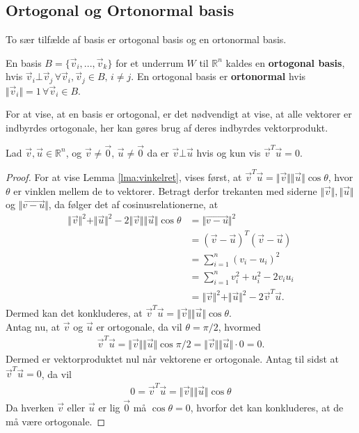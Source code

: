 \subsection{Ortogonal og Ortonormal basis}
To sær tilfælde af basis er ortogonal basis og en ortonormal basis.
\begin{defn}
En basis $B = \{\vec{v}_i,..., \vec{v}_k\}$ for  et underrum $W$ til $\mathds{R}^n$ kaldes en \textbf{ortogonal basis}, hvis 
$\vec{v}_i \bot \vec{v}_j \, \forall \vec{v}_i, \vec{v}_j \in B, \, i \neq j$. En ortogonal basis er \textbf{ortonormal} hvis $\Vert\vec{v}_i\Vert = 1 \, \forall \vec{v}_i \in B$.
\end{defn}
For at vise, at en basis er ortogonal, er det nødvendigt at vise, at alle vektorer er indbyrdes ortogonale, her kan gøres brug af deres indbyrdes vektorprodukt.
\begin{lma}
Lad $\vec{v}, \vec{u} \in \mathds{R}^n$, og $\vec{v}\neq \vec{0}$, $\vec{u} \neq \vec{0}$ da er $\vec{v} \bot \vec{u}$ hvis og kun vis $\vec{v}^T\vec{u} = 0$.
\label{lma:vinkelret}
\end{lma}
\begin{proof}
For at vise Lemma \ref{lma:vinkelret}, vises først, at $\vec{v}^T\vec{u} = \Vert\vec{v}\Vert\Vert\vec{u}\Vert\cos{\theta}$, hvor $\theta$ er vinklen mellem de to vektorer. 
Betragt derfor trekanten med siderne $\Vert\vec{v}\Vert , \Vert\vec{u}\Vert$ og $\Vert\vec{v-u}\Vert$, da følger det af cosinusrelationerne, at 
\begin{align*}
\Vert\vec{v}\Vert^2 +  \Vert\vec{u}\Vert^2 - 2\Vert\vec{v}\Vert\Vert\vec{u}\Vert\cos{\theta} &= \Vert\vec{v-u}\Vert^2 
\\ &= (\vec{v}-\vec{u})^T(\vec{v}-\vec{u})
\\&= \sum_{i=1}^n (v_i- u_i)^2 
\\&= \sum_{i=1}^n v_i^2 + u_i^2 - 2 v_iu_i 
\\&= \Vert\vec{v}\Vert^2 +  \Vert\vec{u}\Vert^2 - 2\vec{v}^T\vec{u}.
\end{align*}
Dermed kan det konkluderes,  at $\vec{v}^T\vec{u} = \Vert\vec{v}\Vert\Vert\vec{u}\Vert\cos{\theta}$.
\\Antag nu, at $\vec{v}$ og $\vec{u}$ er ortogonale, da vil $\theta= \pi/2$, hvormed
\begin{align*}
\vec{v}^T\vec{u} = \Vert\vec{v}\Vert\Vert\vec{u}\Vert\cos{\pi/2}= \Vert\vec{v}\Vert\Vert\vec{u}\Vert\cdot0 = 0.
\end{align*}
Dermed er vektorproduktet nul når vektorene er ortogonale.
Antag til sidst at $\vec{v}^T\vec{u}=0$, da vil 
\begin{align*}
0 = \vec{v}^T\vec{u} = \Vert\vec{v}\Vert\Vert\vec{u}\Vert\cos{\theta}
\end{align*}
Da hverken $\vec{v}$ eller $\vec{u}$ er lig $\vec{0}$ må $\cos{\theta} = 0 $, hvorfor det kan konkluderes, at de må være ortogonale.
\end{proof}
